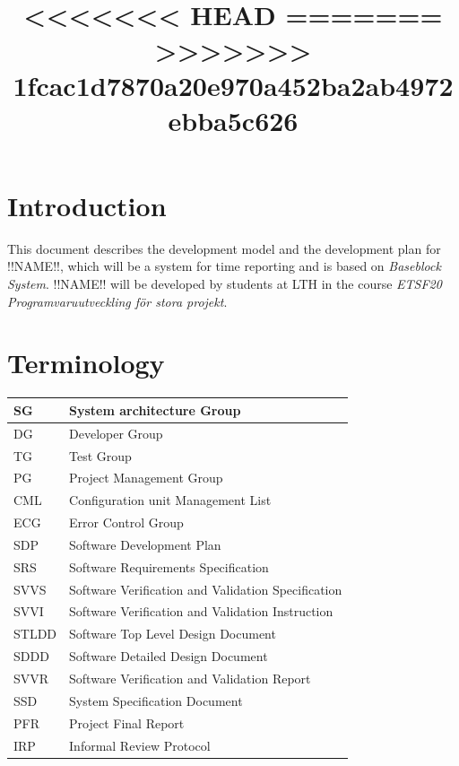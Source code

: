 \documentclass{article}
\date {#1}
\title {
    \documentNumber {01}    %
    \documentVersion {0.1}
<<<<<<< HEAD
    \documentTitle {Software development plan - SDP 123}
=======
    \documentTitle {Software Development Plan}
>>>>>>> 1fcac1d7870a20e970a452ba2ab4972ebba5c626
    \documentGroup {2}
    \documentResponsible {(PG) Project Management Group}
    \documentAuthors {(PG) Project Management Group}
    \documentDate {2021-02-01}
}
\begin{document}
\maketitle
\thispagestyle{empty}

\newpage

\tableofcontents

\newpage


\section{Introduction}
    This document describes the development model and the development plan for !!NAME!!, 
    which will be a system for time reporting and is based on \textit{Baseblock System}.
    !!NAME!! will be developed by students at LTH in the course 
    \textit{ETSF20 Programvaruutveckling för stora projekt}.

\section{Terminology}
    \renewcommand{\arraystretch}{1.7}  %
    
    \begin{table}[h]
        \centering
        \begin{tabular}{| l | l |}
            \hline
                SG & System architecture Group \\
            \hline
                DG & Developer Group \\
            \hline
                TG & Test Group \\
            \hline
                PG & Project Management Group \\
            \hline 
                CML & Configuration unit Management List \\
            \hline            
                ECG & Error Control Group \\
            \hline
                SDP & Software Development Plan \\
            \hline
                SRS & Software Requirements Specification \\
            \hline
                SVVS & Software Verification and Validation Specification \\
            \hline
                SVVI & Software Verification and Validation Instruction \\
            \hline
                STLDD & Software Top Level Design Document \\
            \hline
                SDDD & Software Detailed Design Document \\
            \hline
                SVVR & Software Verification and Validation Report \\
            \hline
                SSD & System Specification Document \\
            \hline
                PFR & Project Final Report \\
            \hline
                IRP & Informal Review Protocol \\
            \hline
        \end{tabular}
    \end{table}
\end{document}
